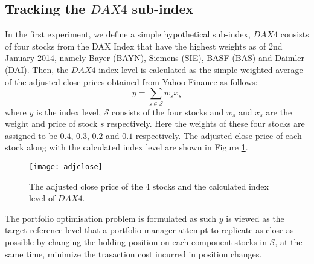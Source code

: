 \subsection{Tracking the $DAX4$ sub-index}
In the first experiment, we define a simple hypothetical sub-index, $DAX4$ consists of four stocks from the DAX Index that have the highest weights as of 2nd January 2014, namely Bayer (BAYN), Siemens (SIE), BASF (BAS) and Daimler (DAI). Then, the $DAX4$ index level is calculated as the simple weighted average of the adjusted close prices obtained from Yahoo Finance as follows:
\begin{equation}
  y = \sum_{s \in \mathcal{S}} w_s x_s
\end{equation}
where $y$ is the index level, $\mathcal{S}$ consists of the four stocks and  $w_s$ and $x_s$ are the weight and price of stock $s$ respectively. Here the weights of these four stocks are assigned to be $0.4$, $0.3$, $0.2$ and $0.1$ respectively. The adjusted close price of each stock along with the calculated index level are shown in Figure \ref{fig:adjclose}.
 
\begin{figure}[htbp]
\centering
\texttt{[image: adjclose]}
\caption{The adjusted close price of the 4 stocks and the calculated index level of $DAX4$.}
\label{fig:adjclose}
\end{figure}
 
The portfolio optimisation problem is formulated as such $y$ is viewed as the target reference level that a portfolio manager attempt to replicate as close as possible by changing the holding position on each component stocks in $\mathcal{S}$, at the same time, minimize the trasaction cost incurred in position changes.
 
